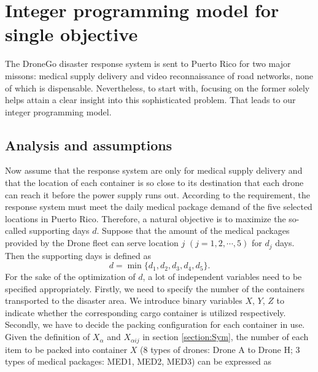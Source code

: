 \documentclass{mcmthesis}
\begin{document}
\section{Integer programming model for single objective}\label{section:ip}

The DroneGo disaster response system is sent to Puerto Rico for two major missons: medical supply delivery and video reconnaissance of road networks, none of which is dispensable. Nevertheless, to start with, focusing on the former solely helps attain a clear insight into this sophisticated problem. That leads to our integer programming model.

\subsection{Analysis and assumptions}

\noindent Now assume that the response system are only for medical supply delivery and that the location of each container is so close to its destination that each drone can reach it before the power supply runs out. According to the requirement, the response system must meet the daily medical package demand of the five selected locations in Puerto Rico. Therefore, a natural objective is to maximize the so-called supporting days $d$. Suppose that the amount of the medical packages provided by the Drone fleet can serve location $j$ $(j=1,2,\cdots,5)$ for $d_j$ days. Then the supporting days is defined as
\begin{equation*}
	d=\min\{d_1,d_2,d_3,d_4,d_5\}.
\end{equation*}
For the sake of the optimization of $d$, a lot of independent variables need to be specified appropriately. Firstly, we need to specify the number of the containers transported to the disaster area. We introduce binary variables $X$, $Y$, $Z$ to indicate whether the corresponding cargo container is utilized respectively. Secondly, we have to decide the packing configuration for each container in use. Given the definition of $X_\alpha$ and $X_{\alpha ij}$ in section \ref{section:Sym}, the number of each item to be packed into container $X$ (8 types of drones: Drone A to Drone H; 3 types of medical packages: MED1, MED2, MED3) can be expressed as
 
\end{document}
